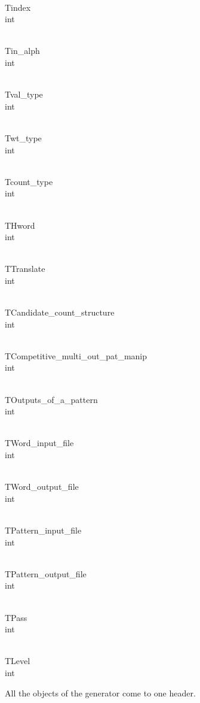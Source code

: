\Y\B\F\\{Tindex} \5
\\{int}\par
\B\F\\{Tin\_alph} \5
\\{int}\par
\B\F\\{Tval\_type} \5
\\{int}\par
\B\F\\{Twt\_type} \5
\\{int}\par
\B\F\\{Tcount\_type} \5
\\{int}\par
\B\F\\{THword} \5
\\{int}\par
\B\F\\{TTranslate} \5
\\{int}\par
\B\F\\{TCandidate\_count\_structure} \5
\\{int}\par
\B\F\\{TCompetitive\_multi\_out\_pat\_manip} \5
\\{int}\par
\B\F\\{TOutputs\_of\_a\_pattern} \5
\\{int}\par
\B\F\\{TWord\_input\_file} \5
\\{int}\par
\B\F\\{TWord\_output\_file} \5
\\{int}\par
\B\F\\{TPattern\_input\_file} \5
\\{int}\par
\B\F\\{TPattern\_output\_file} \5
\\{int}\par
\B\F\\{TPass} \5
\\{int}\par
\B\F\\{TLevel} \5
\\{int}\par
\fi

All the objects of the generator come to one header.

